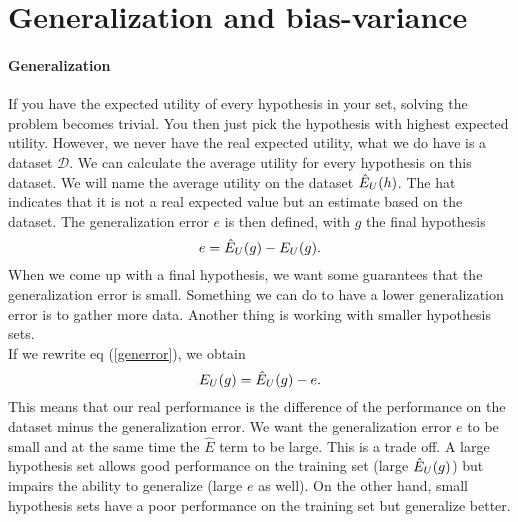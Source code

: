 \documentclass{report}
\theoremstyle{definition}
\begin{document}
	\section{Generalization and bias-variance}
	\paragraph{Generalization}
If you have the expected utility of every hypothesis in your set, solving the problem becomes trivial. You then just pick the hypothesis with highest expected utility. However, we never have the real expected utility, what we do have is a dataset $\mathcal{D}$. We can calculate the average utility for every hypothesis on this dataset. We will name the average utility on the dataset $\hat{E}_{\tiny U}(h)$. The hat indicates that it is not a real expected value but an estimate based on the dataset. The generalization error $e$ is then defined, with $g$ the final hypothesis
\begin{equation} \label{generror}
e = \hat{E}_{\tiny U}(g) - E_{\tiny U}(g).
\end{equation}
When we come up with a final hypothesis, we want some guarantees that the generalization error is small. Something we can do to have a lower generalization error is to gather more data. Another thing is working with smaller hypothesis sets.\\
If we rewrite eq (\ref{generror}), we obtain
\begin{equation} 
E_{\tiny U}(g) = \hat{E}_{\tiny U}(g) - e. 
\end{equation}
This means that our real performance is the difference of the performance on the dataset minus the generalization error. We want the generalization error $e$ to be small and at the same time the $\hat{E}$ term to be large. This is a trade off. A large hypothesis set allows good performance on the training set (large $\hat{E}_{\tiny U}(g)$) but impairs the ability to generalize (large $e$ as well). On the other hand, small hypothesis sets have a poor performance on the training set but generalize better.
\end{document}
